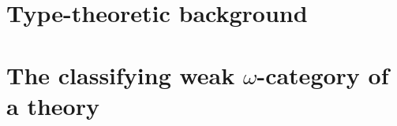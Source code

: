 \documentclass{amsbook}
\begin{document}

\mainmatter

\chapter{Type-theoretic background}



\chapter{The classifying weak $\omega$-category of a theory}


























\backmatter




\end{document}
